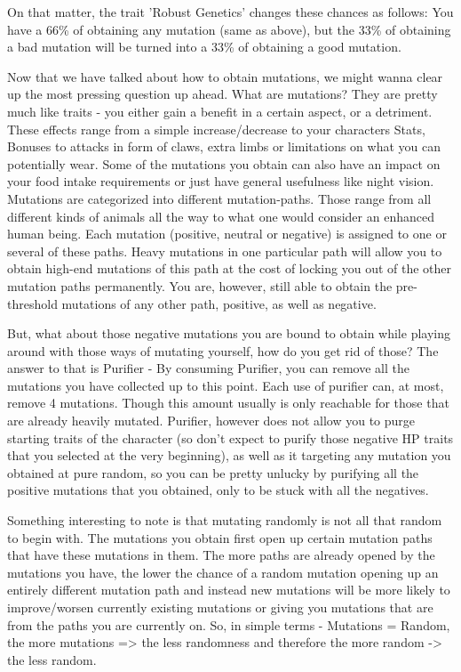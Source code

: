 On that matter, the trait 'Robust Genetics' changes these chances as follows: You have a 66\% of obtaining any mutation (same as above), but the 33\% of obtaining a bad mutation will be turned into a 33\% of obtaining a good mutation.

Now that we have talked about how to obtain mutations, we might wanna clear up the most pressing question up ahead. What are mutations?
They are pretty much like traits - you either gain a benefit in a certain aspect, or a detriment. These effects range from a simple increase/decrease to your characters Stats, Bonuses to attacks in form of claws, extra limbs or limitations on what you can potentially wear. Some of the mutations you obtain can also have an impact on your food intake requirements or just have general usefulness like night vision. Mutations are categorized into different mutation-paths. Those range from all different kinds of animals all the way to what one would consider an enhanced human being. Each mutation (positive, neutral or negative) is assigned to one or several of these paths. Heavy mutations in one particular path will allow you to obtain high-end mutations of this path at the cost of locking you out of the other mutation paths permanently. You are, however, still able to obtain the pre-threshold mutations of any other path, positive, as well as negative.

But, what about those negative mutations you are bound to obtain while playing around with those ways of mutating yourself, how do you get rid of those? The answer to that is Purifier - By consuming Purifier, you can remove all the mutations you have collected up to this point. Each use of purifier can, at most, remove 4 mutations. Though this amount usually is only reachable for those that are already heavily mutated. Purifier, however does not allow you to purge starting traits of the character (so don't expect to purify those negative HP traits that you selected at the very beginning), as well as it targeting any mutation you obtained at pure random, so you can be pretty unlucky by purifying all the positive mutations that you obtained, only to be stuck with all the negatives.

Something interesting to note is that mutating randomly is not all that random to begin with. The mutations you obtain first open up certain mutation paths that have these mutations in them. The more paths are already opened by the mutations you have, the lower the chance of a random mutation opening up an entirely different mutation path and instead new mutations will be more likely to improve/worsen currently existing mutations or giving you mutations that are from the paths you are currently on. So, in simple terms - Mutations = Random, the more mutations => the less randomness and therefore the more random -> the less random.

